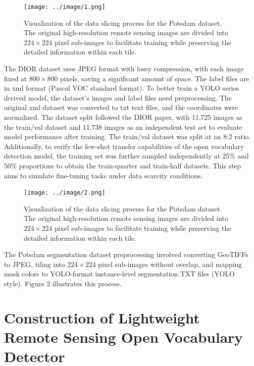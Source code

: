 \documentclass{article}
\begin{document}
\begin{figure}[htbp]
    \centering
    \texttt{[image: ../image/1.png]}
    \caption{Visualization of the data slicing process for the Potsdam dataset. The original high-resolution remote sensing images are divided into $224 \times 224$ pixel sub-images to facilitate training while preserving the detailed information within each tile.}
    \label{fig:xView-slicing}
\end{figure}

The DIOR dataset uses JPEG format with lossy compression, with each image 
fixed at $800 \times 800$ pixels, saving a significant amount of space. 
The label files are in xml format (Pascal VOC standard format). To better 
train a YOLO series derived model, the dataset's images and label files 
need preprocessing. The original xml dataset was converted to txt text 
files, and the coordinates were normalized. The dataset split followed 
the DIOR paper, with 11,725 images as the train/val dataset and 
11,738 images as an independent test set to evaluate model performance 
after training. The train/val dataset was split at an 8:2 ratio. Additionally, 
to verify the few-shot transfer capabilities of the open vocabulary detection 
model, the training set was further sampled independently at 25\% and 50\% 
proportions to obtain the train-quarter and train-half datasets. This step 
aims to simulate fine-tuning tasks under data scarcity conditions.

\begin{figure}[htbp]
    \centering
    \texttt{[image: ../image/2.png]}
    \caption{Visualization of the data slicing process for the Potsdam dataset. The original high-resolution remote sensing images are divided into $224 \times 224$ pixel sub-images to facilitate training while preserving the detailed information within each tile.}
    \label{fig:potsdam-slicing}
\end{figure}

The Potsdam segmentation dataset preprocessing involved  
converting GeoTIFFs to JPEG,  
tiling into $224 \times 224$ pixel sub-images without overlap,  
and mapping mask colors to YOLO-format instance-level segmentation TXT files  
(YOLO style).  
Figure 2 illustrates this process.  


\section{Construction of Lightweight Remote Sensing Open Vocabulary Detector}
\end{document}
